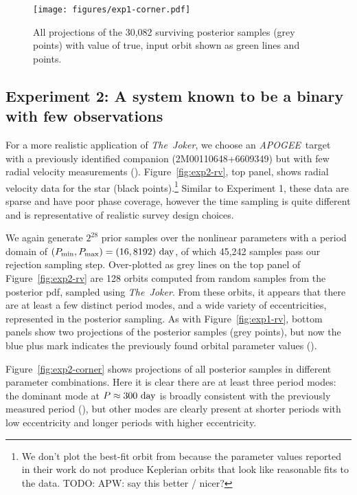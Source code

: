 \documentclass[manuscript, letterpaper]{aastex6}
\newcommand{\project}[1]{\textsl{#1}}
\newcommand{\acronym}[1]{{\small{#1}}}
\newcommand{\apogee}{\project{\acronym{APOGEE}}}
\newcommand{\samplername}{\project{The~Joker}}
\newcommand{\figname}{Figure}
\newcommand{\todo}[1]{{\color{red}TODO: #1}}
\begin{document}
\begin{figure}[p]
\begin{center}
\texttt{[image: figures/exp1-corner.pdf]}
\end{center}
\caption{%
All projections of the 30,082 surviving posterior samples (grey points) with
value of true, input orbit shown as green lines and points.
\label{fig:exp1-corner}}
\end{figure}

\subsection{Experiment 2: A system known to be a binary with few observations}

For a more realistic application of \samplername, we choose an \apogee\ target
with a previously identified companion (2M00110648+6609349) but with few radial
velocity measurements (\citealt{Troup:2016}).
\figname~\ref{fig:exp2-rv}, top panel, shows radial velocity data for the star
(black points).\footnote{We don't plot the best-fit orbit from
\citealt{Troup:2016} because the parameter values reported in their work do not
produce Keplerian orbits that look like reasonable fits to the data.
\todo{APW: say this better / nicer?}}
Similar to Experiment 1, these data are sparse and have poor phase coverage,
however the time sampling is quite different and is representative of realistic
survey design choices.

We again generate $2^{28}$ prior samples over the nonlinear parameters with a
period domain of $(P_{\rm min}, P_{\rm max}) = (16, 8192)~{\rm day}$, of which
45,242 samples pass our rejection sampling step.
Over-plotted as grey lines on the top panel of \figname~\ref{fig:exp2-rv} are
128 orbits computed from random samples from the posterior pdf, sampled using
\samplername.
From these orbits, it appears that there are at least a few distinct period
modes, and a wide variety of eccentricities, represented in the posterior
sampling.
As with \figname~\ref{fig:exp1-rv}, bottom panels show two projections of the
posterior samples (grey points), but now the blue plus mark indicates the
previously found orbital parameter values (\citealt{Troup:2016}).

\figname~\ref{fig:exp2-corner} shows projections of all posterior samples in
different parameter combinations.
Here it is clear there are at least three period modes: the dominant mode at $P
\approx 300~{\rm day}$ is broadly consistent with the previously measured period
(\citealt{Troup:2016}), but other modes are clearly present at shorter periods
with low eccentricity and longer periods with higher eccentricity.
\end{document}
